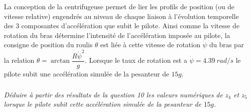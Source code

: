 \documentclass[10pt,fleqn]{article} %
\begin{document}
\begin{multicols}{2}
La conception de la centrifugeuse permet de lier les profils de position (ou de vitesse relative) engendrés au
niveau de chaque liaison à l’évolution temporelle des 3 composantes d’accélération que subit le pilote. Ainsi
comme la vitesse de rotation du bras détermine l’intensité de l’accélération imposée au pilote, la consigne
de position du roulis $\theta$ est liée à cette vitesse de rotation $\dot{\psi}$ du bras par la relation
$ \theta=\arctan\dfrac{R\dot{\psi}^2}{g}$. Lorsque le taux de rotation est a $\dot{\psi}=\SI{4,39}{rad/s}$ le pilote subit une accélération simulée de la pesanteur de $15g$.


\subparagraph{}
\textit{Déduire à partir des résultats de la question 10 les valeurs numériques de $z_4$ et $z_5$ lorsque le pilote
subit cette accélération simulée de la pesanteur de $15 g$.}

\end{multicols}

\cleardoublepage
\end{document}
